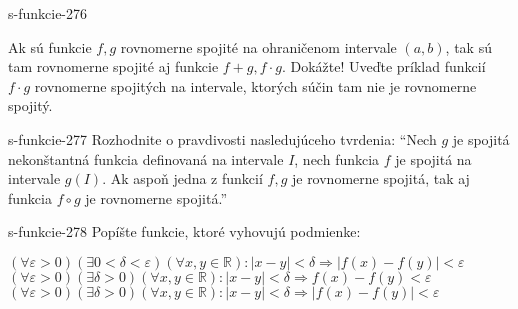 \begin{defproblem}{s-funkcie-276}
\begin{tasks}
\task
  Ak sú funkcie $f,g$ rovnomerne spojité na ohraničenom intervale $(a,b)$, tak
  sú tam rovnomerne spojité aj funkcie $f+g,f \cdot g$. Dokážte!
\task
  Uveďte príklad funkcií $f \cdot g$ rovnomerne spojitých na intervale, ktorých
  súčin tam nie je rovnomerne spojitý.
\end{tasks}
\end{defproblem}

\begin{defproblem}{s-funkcie-277}
Rozhodnite o pravdivosti nasledujúceho tvrdenia: \enquote{Nech $g$ je spojitá
nekonštantná funkcia definovaná na intervale $I$, nech funkcia $f$ je spojitá na
intervale $g(I)$. Ak aspoň jedna z funkcií $f,g$ je rovnomerne spojitá, tak aj
funkcia $f \circ g$ je rovnomerne spojitá.}
\end{defproblem}

\begin{defproblem}{s-funkcie-278}
Popíšte funkcie, ktoré vyhovujú podmienke:
\begin{tasks}
\task
  $
    (\forall \varepsilon > 0)
      (\exists 0 < \delta <\varepsilon)
        (\forall x,y \in \mathbb{R}){:}
          |x-y| < \delta \Rightarrow |f(x)-f(y)|<\varepsilon
  $
\task
  $
    (\forall \varepsilon > 0)
      (\exists \delta > 0)
        (\forall x,y \in \mathbb{R}):
          |x - y| < \delta \Rightarrow f(x)-f(y) < \varepsilon
  $
\task
  $
    (\forall \varepsilon > 0)
      (\exists \delta > 0)
        (\forall x,y \in \mathbb{R}):
          |x-y| < \delta \Rightarrow |f(x)-f(y)| < \varepsilon$
\end{tasks}
\end{defproblem}

